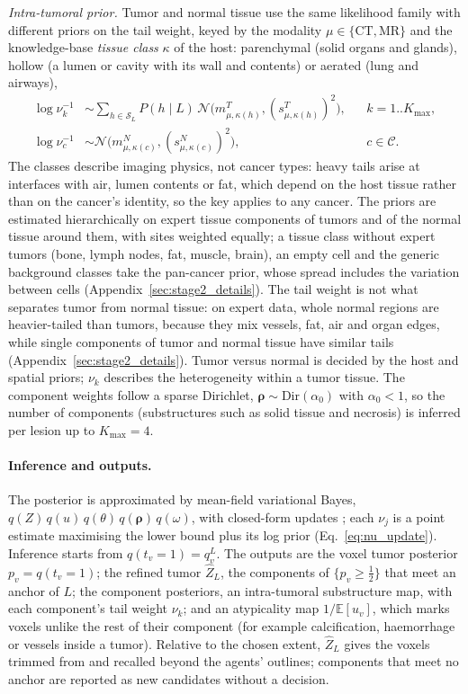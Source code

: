 \documentclass[fleqn,10pt]{olplainarticle}
\begin{document}
\emph{Intra-tumoral prior.} Tumor and normal tissue use the same likelihood family with different priors on the tail weight,
keyed by the modality $\mu\in\{\mathrm{CT},\mathrm{MR}\}$ and the knowledge-base \emph{tissue class} $\kappa$ of the host:
parenchymal (solid organs and glands), hollow (a lumen or cavity with its wall and contents) or aerated (lung and airways),
\begin{equation}
\label{eq:nu_prior}
\begin{aligned}
\log\nu_k^{-1}&\sim\textstyle\sum_{h\in\mathcal{S}_L}P(h\mid L)\,\mathcal{N}\bigl(m^T_{\mu,\kappa(h)},(s^T_{\mu,\kappa(h)})^2\bigr), && k=1..K_{\max},\\
\log\nu_c^{-1}&\sim\mathcal{N}\bigl(m^N_{\mu,\kappa(c)},(s^N_{\mu,\kappa(c)})^2\bigr), && c\in\mathcal{C}.
\end{aligned}
\end{equation}
The classes describe imaging physics, not cancer types: heavy tails arise at interfaces with air, lumen contents or fat, which
depend on the host tissue rather than on the cancer's identity, so the key applies to any cancer. The priors are estimated
hierarchically on expert tissue components of tumors and of the normal tissue around them, with sites weighted equally; a
tissue class without expert tumors (bone, lymph nodes, fat, muscle, brain), an empty cell and the generic background classes
take the pan-cancer prior, whose spread includes the variation between cells (Appendix~\ref{sec:stage2_details}). The tail weight is
not what separates tumor from normal tissue: on expert data, whole normal regions are heavier-tailed than tumors, because they
mix vessels, fat, air and organ edges, while single components of tumor and normal tissue have similar tails
(Appendix~\ref{sec:stage2_details}). Tumor versus normal is decided by the host and spatial priors; $\nu_k$ describes the
heterogeneity within a tumor tissue. The component weights follow a sparse Dirichlet, $\boldsymbol\rho\sim\mathrm{Dir}(\alpha_0)$
with $\alpha_0<1$, so the number of components (substructures such as solid tissue and necrosis) is inferred per lesion up to
$K_{\max}=4$.

\paragraph{Inference and outputs.} The posterior is approximated by mean-field variational Bayes,
$q(Z)\,q(u)\,q(\theta)\,q(\boldsymbol\rho)\,q(\omega)$, with closed-form updates \cite{gao2023bayeseg}; each $\nu_j$ is a point
estimate maximising the lower bound plus its log prior (Eq.~\eqref{eq:nu_update}). Inference starts from $q(t_v=1)=q^L_v$. The
outputs are the voxel tumor posterior $p_v=q(t_v=1)$; the refined tumor $\hat Z_L$, the components of $\{p_v\ge\tfrac12\}$ that
meet an anchor of $L$; the component posteriors, an intra-tumoral substructure map, with each component's tail weight $\nu_k$;
and an atypicality map $1/\mathbb{E}[u_v]$, which marks voxels unlike the rest of their component (for example calcification,
haemorrhage or vessels inside a tumor). Relative to the chosen extent, $\hat Z_L$ gives the voxels trimmed from and recalled
beyond the agents' outlines; components that meet no anchor are reported as new candidates without a decision.
\end{document}
